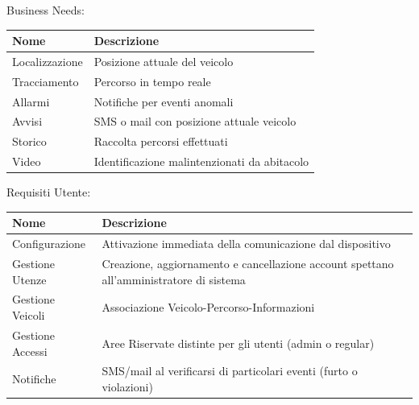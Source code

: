 \documentclass[a4paper,12pt]{beamer}
\begin{document}
\begin{frame}
\begin{table}[h]
Business Needs:
\begin{center}
\begin{tabular}{ p{2.5cm}  p{6.5cm} }
\rowcolor{Ash}	
\hline	
Nome & Descrizione \\ \hline
Localizzazione & Posizione attuale del veicolo \\ 
Tracciamento & Percorso in tempo reale \\ 
Allarmi & Notifiche per eventi anomali \\ 
Avvisi & SMS o mail con posizione attuale veicolo \\ 
Storico & Raccolta percorsi effettuati \\ 
Video & Identificazione malintenzionati da abitacolo \\ \hline
\end{tabular}
\end{center}
\end{table}
\end{frame}

\begin{frame}
\begin{table}[h]
Requisiti Utente:
\begin{center}
\begin{tabular}{ p{3cm}  p{6cm} }
\rowcolor{Ash}	
\hline	
Nome & Descrizione \\ \hline
Configurazione & Attivazione immediata della comunicazione dal dispositivo \\ 
Gestione Utenze & Creazione, aggiornamento e cancellazione account spettano all'amministratore di sistema \\ 
Gestione Veicoli & Associazione Veicolo-Percorso-Informazioni \\ 
Gestione Accessi &  Aree Riservate distinte per gli utenti (admin o regular) \\ 
Notifiche &  SMS/mail al verificarsi di particolari eventi (furto o violazioni)\\ \hline
\end{tabular}
\end{center}
\end{table}
\end{frame}
\end{document}
